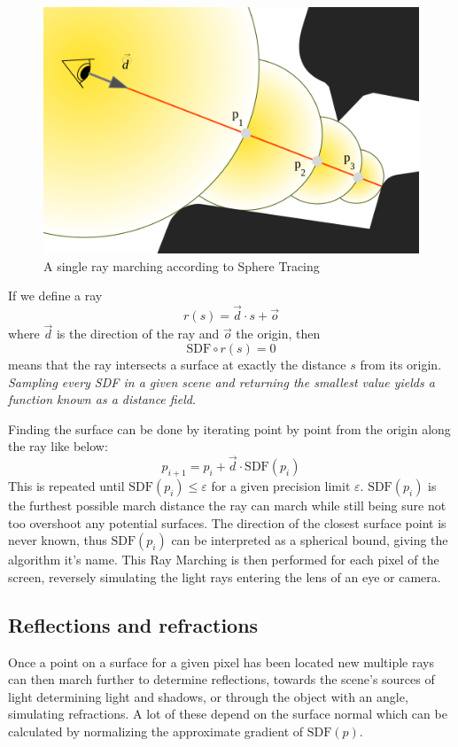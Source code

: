 		\vspace{40pt}
		\begin{figure}
			\begin{flushright}
				\includegraphics[width=0.9\linewidth]{figure/SDF2} 
			\end{flushright}
			\caption{A single ray marching according to Sphere Tracing}
			\vspace{40pt}
		\end{figure}

		If we define a ray $$r(s) = \vec{d} \cdot s + \vec{o}$$
		where $\vec{d}$ is the direction of the ray and $\vec{o}$ the origin, then
		$$\text{SDF}\circ r(s) = 0$$ means that the ray intersects a surface at
		exactly the distance $s$ from its origin. \emph{Sampling every SDF in a
		given scene and returning the smallest value yields a function known as a
		distance field.}

		\bigskip \noindent Finding the surface can be done by iterating point by
		point from the origin along the ray like below: $$p_{i+1} = p_i +
		\vec{d}\cdot \text{SDF}(p_i)$$ This is repeated until $\text{SDF}(p_i) \leq
		\varepsilon$ for a given precision limit $\varepsilon$. $\text{SDF}(p_i)$
		is the furthest possible march distance the ray can march while still being
		sure not too overshoot any potential surfaces. The direction of the closest
		surface point is never known, thus $\text{SDF}(p_i)$ can be interpreted as
		a spherical bound, giving the algorithm it's name. This Ray Marching is
		then performed for each pixel of the screen, reversely simulating the light
		rays entering the lens of an eye or camera.

			\subsection{Reflections and refractions}

				Once a point on a surface for a given pixel has been located
				new multiple rays can then march further to determine
				reflections, towards the scene's sources of light determining
				light and shadows, or through the object with an angle,
				simulating refractions. A lot of these depend on the surface
				normal which can be calculated by normalizing the approximate
				gradient of $\text{SDF}(p)$. 

			
